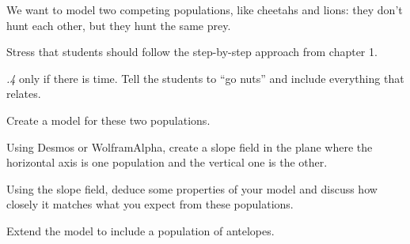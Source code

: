 \question \label{sys:competition}
	We want to model two competing populations, like cheetahs and lions: they don't hunt each other, but they hunt the same prey.
\begin{annotation}
	\begin{goals}
		Stress that students should follow the step-by-step approach from chapter 1.
		
		\emph{.4} only if there is time. Tell the students to ``go nuts'' and include everything that relates.
	\end{goals}
\end{annotation}
\begin{parts}
	\item Create a model for these two populations.
	\item Using Desmos or WolframAlpha, create a slope field in the plane where the horizontal axis is one population and the vertical one is the other.
	\item Using the slope field, deduce some properties of your model and discuss how closely it matches what you expect from these populations.

	\item Extend the model to include a population of antelopes.	
\end{parts}





\bookonlynewpage

